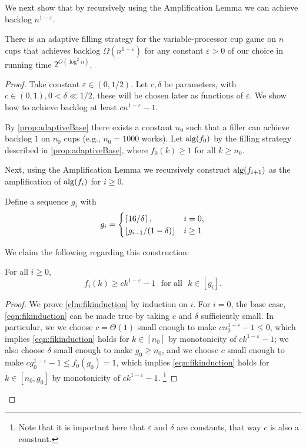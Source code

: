 We next show that by recursively using the Amplification Lemma we
can achieve backlog $n^{1 - \varepsilon}$.
\begin{theorem}
  \label{thm:adaptivePoly}
  There is an adaptive filling strategy for the variable-processor cup game on
  $n$ cups that achieves backlog $\Omega(n^{1-\varepsilon})$ for any constant
  $\varepsilon > 0$ of our choice in running time $2^{O(\log^2 n)}$.
\end{theorem}
\begin{proof}
  Take constant $\varepsilon \in (0,1/2)$. Let $c, \delta$ be
  parameters, with $c\in (0,1), 0 < \delta \ll 1/2$, these will
  be chosen later as functions of $\varepsilon$.
  We show how to achieve backlog at least $cn^{1-\varepsilon}-1$.

  By \cref{prop:adaptiveBase} there exists a constant
  $n_0$ such that a filler can achieve backlog $1$
  on $n_0$ cups (e.g., $n_0 = 1000$ works). Let $\operatorname{\text{\textup{alg}}}(f_0)$ by
  the filling strategy described in \cref{prop:adaptiveBase},
  where $f_0(k)
  \ge 1$ for all $k\ge n_0$. 

  Next, using the Amplification Lemma we recursively construct
  $\operatorname{\text{\textup{alg}}}(f_{i+1})$ as the amplification of $\operatorname{\text{\textup{alg}}}(f_{i})$ for $i\ge 0$. 

  Define a sequence $g_i$ with 
  $$ g_i = \begin{cases}
    \left\lceil 16/\delta \right\rceil,  & i = 0,\\
    \left\lfloor g_{i-1}/(1-\delta) \right\rfloor & i \ge 1
  \end{cases} $$

  We claim the following regarding this construction:
  \begin{clm}
    \label{clm:fikinduction}
    For all $i\ge0$,
    \begin{equation}
      f_i(k) \ge ck^{1-\varepsilon}-1\,\, \text{ for all }\,\, k\in [g_{i}].
    \label{eqn:fikinduction}
    \end{equation}
  \end{clm}
  \begin{proof}
  We prove \cref{clm:fikinduction} by induction on $i$.
  For $i=0$, the base case, \eqref{eqn:fikinduction} can
  be made true by taking $c$ and $\delta$ sufficiently small.
  In particular, we we choose $c=\Theta(1)$ small enough to make 
  $c n_0^{1-\varepsilon} -1 \le 0$, which implies
  \eqref{eqn:fikinduction} holds for $k \in [n_0]$ by
  monotonicity of $ck^{1-\varepsilon}-1$; we also choose $\delta$
  small enough to make $g_0 \ge n_0$, and we choose $c$ small
  enough to make $c g_0^{1-\varepsilon} -1 \le f_0(g_0) = 1$, which
  implies \eqref{eqn:fikinduction} holds for $k\in [n_0, g_0]$ by
  monotonicity of $ck^{1-\varepsilon}-1$. \footnote{Note
  that it is important here that $\varepsilon$ and
  $\delta$ are constants, that way $c$ is also a constant.}


\end{proof}
\end{proof}
